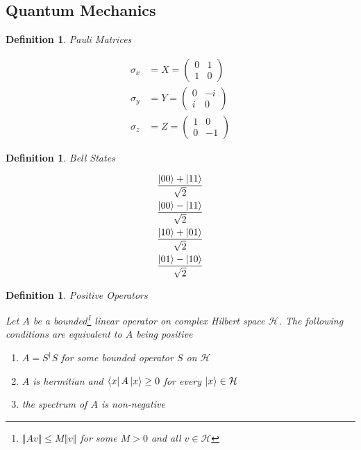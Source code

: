\documentclass[11pt]{article}
\newcommand\0{\mathbf{0}}
\newcommand\<{\langle}
\renewcommand\>{\rangle}
\newtheorem{definition}[theorem]{Definition}
\begin{document}
\begin{appendices}
\section{Quantum Mechanics}

\begin{definition}
\label{pauli}
Pauli Matrices

\begin{align*}
\sigma_x &= X = \begin{pmatrix} 0 & 1 \\ 1 & 0\end{pmatrix} \\
\sigma_y &= Y = \begin{pmatrix} 0 & -i \\ i & 0\end{pmatrix}\\
\sigma_z &= Z = \begin{pmatrix} 1 & 0 \\ 0 & -1\end{pmatrix}
\end{align*}
\end{definition}

\begin{definition}
\label{bellstates}
Bell States

\begin{align*}
\frac{\ket{00} + \ket{11} }{\sqrt{2}} \\	
\frac{\ket{00} - \ket{11} }{\sqrt{2}} \\	
\frac{\ket{10} + \ket{01} }{\sqrt{2}} \\	
\frac{\ket{01} - \ket{10} }{\sqrt{2}}
\end{align*}
\end{definition}

\begin{definition}
\label{posop}
Positive Operators

Let $A$ be a bounded\footnote{$\Vert Av \Vert \leq M\Vert v \Vert$ for some $M>0$ and all $v \in \mathcal{H}$} linear operator on complex Hilbert space $\mathcal{H}$. The following conditions are equivalent to $A$ being positive

\begin{enumerate}
\item $A=S^\dag S$ for some bounded operator $S$ on $\mathcal{H}$
\item $A$ is hermitian and $\bra{x} A \ket{x} \geq 0$ for every $\ket{x} \in \mathcal{H}$
\item the spectrum of $A$ is non-negative
\end{enumerate}
\end{definition}


\end{appendices}
\end{document}
